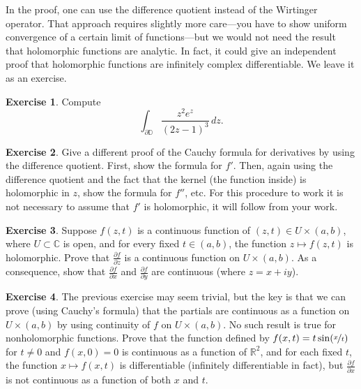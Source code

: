 \documentclass[12pt,openany]{book}
\newcommand{\C}{{\mathbb{C}}}
\newcommand{\R}{{\mathbb{R}}}
\newcommand{\D}{{\mathbb{D}}}
\theoremstyle{plain}
\theoremstyle{remark}
\theoremstyle{definition}
\newenvironment{exbox}{%
    \def\FrameCommand{\vrule width 1pt \relax\hspace{10pt}}%
    \MakeFramed{\advance\hsize-\width\FrameRestore}%
}{%
    \endMakeFramed
}
\theoremstyle{exercise}
\newtheorem{exercise}{Exercise}[section]
\theoremstyle{example}
\begin{document}
In the proof, one can use the difference quotient instead of the
Wirtinger operator.  That approach requires slightly more care---you have to show
uniform convergence of a certain limit of functions---but we
would not need the result
that holomorphic functions are analytic.  In fact,
it could give an independent proof that holomorphic functions are infinitely
complex differentiable.
We leave it as an exercise.

\begin{exbox}
\begin{exercise}
Compute
\begin{equation*}
\int_{\partial \D}
\frac{z^2 e^z}{(2z-1)^3} \, dz .
\end{equation*}
\end{exercise}

\begin{exercise}
Give a different proof of the Cauchy formula for derivatives by using the difference
quotient.  First, show the formula for $f'$.
Then, again using the difference
quotient and the fact that the kernel (the function inside) is holomorphic
in $z$, show the formula for $f''$, etc.  For this procedure to work it is
not necessary to assume that $f'$ is holomorphic, it will follow from your
work.
\end{exercise}

\begin{exercise}%
\label{exercise:partialderscont}
Suppose $f(z,t)$ is a continuous function of $(z,t) \in U \times (a,b)$,
where $U \subset \C$ is open, and for every fixed $t \in (a,b)$, the function
$z \mapsto f(z,t)$ is holomorphic.  Prove that
$\frac{\partial f}{\partial z}$ is a continuous function on $U \times
(a,b)$.  As a consequence, show that
$\frac{\partial f}{\partial x}$
and
$\frac{\partial f}{\partial y}$ are continuous (where $z=x+iy$).
\end{exercise}

\begin{exercise}
The previous exercise may seem trivial, but the key is that we can prove
(using Cauchy's formula) that the partials are continuous as a function on
$U \times (a,b)$ by using continuity of $f$ on $U \times (a,b)$.  No such
result is true for nonholomorphic functions.  Prove that the function defined by
$f(x,t) = t \sin(\nicefrac{x}{t})$ for $t \neq 0$ and $f(x,0) =  0$
is continuous as a function of $\R^2$, and for each fixed $t$, the function
$x \mapsto f(x,t)$ is differentiable (infinitely differentiable in fact),
but $\frac{\partial f}{\partial x}$ is not continuous as a function of both
$x$ and $t$.
\end{exercise}
\end{exbox}
\end{document}
